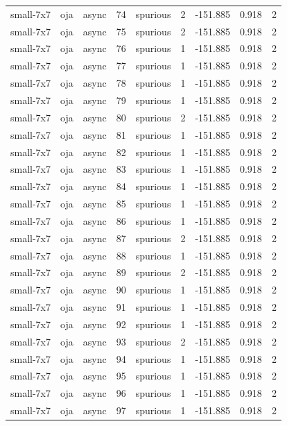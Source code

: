 \begin{tabular}{lllrlrrrr}
small-7x7 & oja & async & 74 & spurious & 2 & -151.885 & 0.918 & 2 \\
small-7x7 & oja & async & 75 & spurious & 2 & -151.885 & 0.918 & 2 \\
small-7x7 & oja & async & 76 & spurious & 1 & -151.885 & 0.918 & 2 \\
small-7x7 & oja & async & 77 & spurious & 1 & -151.885 & 0.918 & 2 \\
small-7x7 & oja & async & 78 & spurious & 1 & -151.885 & 0.918 & 2 \\
small-7x7 & oja & async & 79 & spurious & 1 & -151.885 & 0.918 & 2 \\
small-7x7 & oja & async & 80 & spurious & 2 & -151.885 & 0.918 & 2 \\
small-7x7 & oja & async & 81 & spurious & 1 & -151.885 & 0.918 & 2 \\
small-7x7 & oja & async & 82 & spurious & 1 & -151.885 & 0.918 & 2 \\
small-7x7 & oja & async & 83 & spurious & 1 & -151.885 & 0.918 & 2 \\
small-7x7 & oja & async & 84 & spurious & 1 & -151.885 & 0.918 & 2 \\
small-7x7 & oja & async & 85 & spurious & 1 & -151.885 & 0.918 & 2 \\
small-7x7 & oja & async & 86 & spurious & 1 & -151.885 & 0.918 & 2 \\
small-7x7 & oja & async & 87 & spurious & 2 & -151.885 & 0.918 & 2 \\
small-7x7 & oja & async & 88 & spurious & 1 & -151.885 & 0.918 & 2 \\
small-7x7 & oja & async & 89 & spurious & 2 & -151.885 & 0.918 & 2 \\
small-7x7 & oja & async & 90 & spurious & 1 & -151.885 & 0.918 & 2 \\
small-7x7 & oja & async & 91 & spurious & 1 & -151.885 & 0.918 & 2 \\
small-7x7 & oja & async & 92 & spurious & 1 & -151.885 & 0.918 & 2 \\
small-7x7 & oja & async & 93 & spurious & 2 & -151.885 & 0.918 & 2 \\
small-7x7 & oja & async & 94 & spurious & 1 & -151.885 & 0.918 & 2 \\
small-7x7 & oja & async & 95 & spurious & 1 & -151.885 & 0.918 & 2 \\
small-7x7 & oja & async & 96 & spurious & 1 & -151.885 & 0.918 & 2 \\
small-7x7 & oja & async & 97 & spurious & 1 & -151.885 & 0.918 & 2 \\

\end{tabular}
